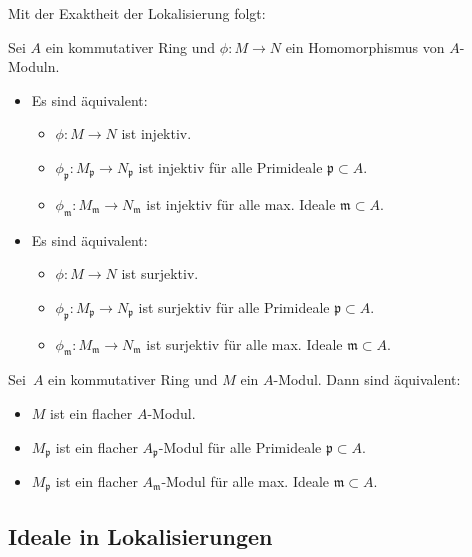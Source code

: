 \documentclass{cheat-sheet}
\newcommand{\ppp}{\mathfrak{p}}
\newcommand{\mmm}{\mathfrak{m}}
\begin{document}

Mit der Exaktheit der Lokalisierung folgt:

\begin{kor}
  Sei $A$ ein kommutativer Ring und $\phi : M \to N$ ein Homomorphismus von $A$-Moduln.
  \begin{itemize}
    \item Es sind äquivalent:
    \begin{itemize}
      \item $\phi : M \to N$ ist injektiv.
      \item $\phi_\ppp : M_\ppp \to N_\ppp$ ist injektiv für alle Primideale $\ppp \subset A$.
      \item $\phi_\mmm : M_\mmm \to N_\mmm$ ist injektiv für alle max. Ideale $\mmm \subset A$.
    \end{itemize}
    \item Es sind äquivalent:
    \begin{itemize}
      \item $\phi : M \to N$ ist surjektiv.
      \item $\phi_\ppp : M_\ppp \to N_\ppp$ ist surjektiv für alle Primideale $\ppp \subset A$.
      \item $\phi_\mmm : M_\mmm \to N_\mmm$ ist surjektiv für alle max. Ideale $\mmm \subset A$.
    \end{itemize}
  \end{itemize}
\end{kor}


\begin{prop}
  Sei~$A$ ein kommutativer Ring und $M$ ein $A$-Modul.
  Dann sind äquivalent:
  \begin{itemize}
    \item $M$ ist ein flacher $A$-Modul.
    \item $M_\ppp$ ist ein flacher $A_\ppp$-Modul für alle Primideale $\ppp \subset A$.
    \item $M_\ppp$ ist ein flacher $A_\mmm$-Modul für alle max. Ideale $\mmm \subset A$.
  \end{itemize}
\end{prop}

\subsection{Ideale in Lokalisierungen}
\end{document}
